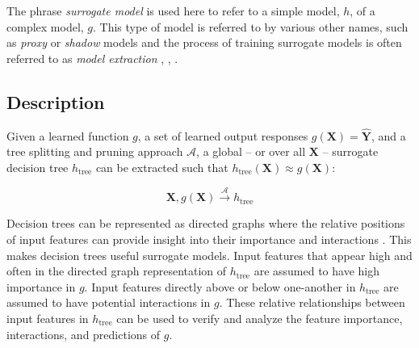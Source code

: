 \documentclass[11pt]{asaproc}
\begin{document}
The phrase \textit{surrogate model} is used here to refer to a simple model, $h$, of a complex model, $g$. This type of model is referred to by various other names, such as \textit{proxy} or \textit{shadow} models and the process of training surrogate models is often referred to as \textit{model extraction} \cite{dt_surrogate1}, \cite{ff_interpretability},  \cite{dt_surrogate2}. 

\subsection{Description}

Given a learned function $g$, a set of learned output responses $g(\mathbf{X}) = \mathbf{\hat{Y}}$, and a tree splitting and pruning approach $\mathcal{A}$, a global -- or over all $\mathbf{X}$ -- surrogate decision tree $h_{\text{tree}}$ can be extracted such that $h_{\text{tree}}(\mathbf{X}) \approx g(\mathbf{X})$:

\begin{equation}
\mathbf{X}, g(\mathbf{X}) \xrightarrow{\mathcal{A}} h_{\text{tree}}
\end{equation}

Decision trees can be represented as directed graphs where the relative positions of input features can provide insight into their importance and interactions \cite{cart}. This makes decision trees useful surrogate models. Input features that appear high and often in the directed graph representation of $h_{\text{tree}}$ are assumed to have high importance in $g$. Input features directly above or below one-another in $h_{\text{tree}}$ are assumed to have potential interactions in $g$. These relative relationships between input features in $h_{\text{tree}}$ can be used to verify and analyze the feature importance, interactions, and predictions of $g$.
\end{document}
